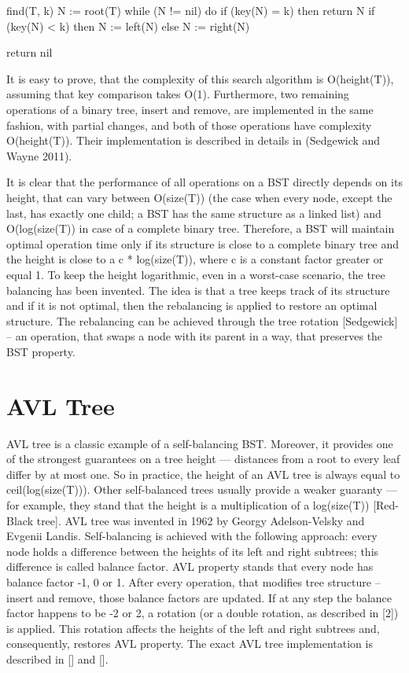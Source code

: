 find(T, k)
N := root(T)
while (N != nil) do
  if (key(N) = k) then
    return N
  if (key(N) < k) then
    N := left(N)
  else
    N := right(N)

return nil

It is easy to prove, that the complexity of this search algorithm is O(height(T)), assuming that key comparison takes O(1). Furthermore, two remaining operations of a binary tree, insert and remove, are implemented in the same fashion, with partial changes, and both of those operations have complexity O(height(T)). Their implementation is described in details in (Sedgewick and Wayne 2011).

It is clear that the performance of all operations on a BST directly depends on its height, that can vary between O(size(T)) (the case when every node, except the last, has exactly one child; a BST has the same structure as a linked list) and O(log(size(T)) in case of a complete binary tree. Therefore, a BST will maintain optimal operation time only if its structure is close to a complete binary tree and the height is close to a c * log(size(T)), where c is a constant factor greater or equal 1. To keep the height logarithmic, even in a worst-case scenario, the tree balancing has been invented. The idea is that a tree keeps track of its structure and if it is not optimal, then the rebalancing is applied to restore an optimal structure. The rebalancing can be achieved through the tree rotation [Sedgewick] – an operation, that swaps a node with its parent in a way, that preserves the BST property.


\section{AVL Tree}

AVL tree is a classic example of a self-balancing BST. Moreover, it provides one of the strongest guarantees on a tree height — distances from a root to every leaf differ by at most one. So in practice, the height of an AVL tree is always equal to ceil(log(size(T))). Other self-balanced trees usually provide a weaker guaranty — for example, they stand that the height is a multiplication of a log(size(T)) [Red-Black tree]. AVL tree was invented in 1962 by Georgy Adelson-Velsky and Evgenii Landis. Self-balancing is achieved with the following approach: every node holds a difference between the heights of its left and right subtrees; this difference is called balance factor. AVL property stands that every node has balance factor -1, 0 or 1. After every operation, that modifies tree structure – insert and remove, those balance factors are updated. If at any step the balance factor happens to be -2 or 2, a rotation (or a double rotation, as described in [2]) is applied. This rotation affects the heights of the left and right subtrees and, consequently, restores AVL property. The exact AVL tree implementation is described in [] and [].

